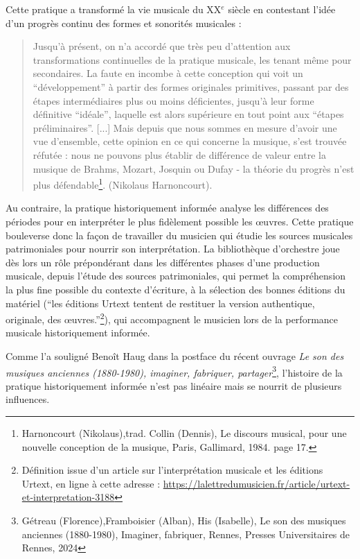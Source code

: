 Cette pratique a transformé la vie musicale du XX$^{e}$ siècle en contestant l'idée d'un progrès continu des formes et sonorités musicales :
\begin{quote}
	Jusqu'à présent, on n'a accordé que très peu d'attention aux transformations continuelles de la pratique musicale, les tenant même pour secondaires. La faute en incombe à cette conception qui voit un \enquote{développement} à partir des formes originales primitives, passant par des étapes intermédiaires plus ou moins déficientes, jusqu'à leur forme définitive \enquote{idéale}, laquelle est alors supérieure en tout point aux \enquote{étapes préliminaires}. [...] Mais depuis que nous sommes en mesure d'avoir une vue d'ensemble, cette opinion en ce qui concerne la musique, s'est trouvée réfutée : nous ne pouvons plus établir de différence de valeur entre la musique de Brahms, Mozart, Josquin ou Dufay - la théorie du progrès n'est plus défendable\footnote{Harnoncourt (Nikolaus),trad. Collin (Dennis), Le discours musical, pour une nouvelle conception de la musique, Paris, Gallimard, 1984. page 17.}. (Nikolaus Harnoncourt).
\end{quote}
Au contraire, la pratique historiquement informée analyse les différences des périodes pour en interpréter le plus fidèlement possible les œuvres. Cette pratique bouleverse donc la façon de travailler du musicien qui étudie les sources musicales patrimoniales pour nourrir son interprétation. 
La bibliothèque d'orchestre joue dès lors un rôle prépondérant dans les différentes phases d'une production musicale, depuis l'étude des sources patrimoniales, qui permet la compréhension la plus fine possible du contexte d'écriture, à la sélection des bonnes éditions du matériel (\enquote{les éditions Urtext tentent de restituer la version authentique, originale, des œuvres.}\footnote{Définition issue d'un article sur l'interprétation musicale et les éditions Urtext, en ligne à cette adresse : \url{https://lalettredumusicien.fr/article/urtext-et-interpretation-3188}}), qui accompagnent le musicien lors de la performance musicale historiquement informée. 

Comme l'a souligné Benoît Haug dans la postface du récent ouvrage \textit{Le son des musiques anciennes (1880-1980), imaginer, fabriquer, partager}\footnote{Gétreau (Florence),Framboisier (Alban), His (Isabelle), Le son des musiques anciennes (1880-1980), Imaginer, fabriquer, Rennes, Presses Universitaires de Rennes, 2024}, l'histoire de la pratique historiquement informée n'est pas linéaire mais se nourrit de plusieurs influences. 


